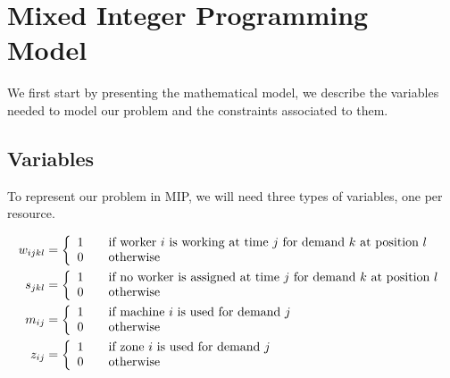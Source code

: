 \documentclass[../../thesis.tex]{subfiles}
\begin{document}
\section{Mixed Integer Programming Model}
\label{section:mipmodel}

We first start by presenting the mathematical model, we describe the variables
needed to model our problem and the constraints associated to them.

\subsection{Variables}

To represent our problem in MIP, we will need three types of variables, one per resource.



\begin{equation*}
\begin{split}
    w_{ijkl} &=  \left \{
                   \begin{array}{l l}
                      1 \quad & \textrm{if worker $i$ is working at time $j$ for demand $k$ at position $l$} \\
                      0 \quad & \textrm{otherwise} 
                   \end{array}
                   \right . \\
  s_{jkl} &=  \left \{
  \begin{array}{l l}
      1 \quad & \textrm{if no worker is assigned at time $j$ for demand $k$ at position $l$} \\
      0 \quad & \textrm{otherwise} 
  \end{array}
  \right . \\
   m_{ij} &=  \left \{
                   \begin{array}{l l}
                      1 \quad & \textrm{if machine $i$ is used for demand $j$} \\
                      0 \quad & \textrm{otherwise} 
                   \end{array}
                   \right . \\
    z_{ij} &= \left \{
               \begin{array}{l l}
                  1 \quad & \textrm{if zone $i$ is used for demand $j$} \\
                  0 \quad & \textrm{otherwise} 
               \end{array}
               \right . \\
\end{split}
\end{equation*}
\end{document}
